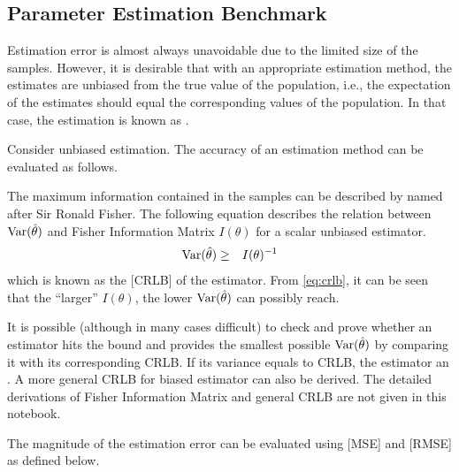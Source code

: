 \subsection{Parameter Estimation Benchmark}

Estimation error is almost always unavoidable due to the limited size of the samples. However, it is desirable that with an appropriate estimation method, the estimates are unbiased from the true value of the population, i.e., the expectation of the estimates should equal the corresponding values of the population. In that case, the estimation is known as . 

Consider unbiased estimation. The accuracy of an estimation method can be evaluated as follows.

The maximum information contained in the samples can be described by  named after Sir Ronald Fisher. The following equation describes the relation between $\textup{Var}(\hat{\theta})$ and Fisher Information Matrix $I(\theta)$ for a scalar unbiased estimator.
\begin{eqnarray}
	\textup{Var}(\hat{\theta}) &\geq& I(\theta)^{-1} \label{eq:crlb}
\end{eqnarray}
which is known as the [CRLB] of the estimator. From \eqref{eq:crlb}, it can be seen that the ``larger'' $I(\theta)$, the lower $\textup{Var}(\hat{\theta})$  can possibly reach.

It is possible (although in many cases difficult) to check and prove whether an estimator hits the bound and provides the smallest possible $\textup{Var}(\hat{\theta})$ by comparing it with its corresponding CRLB. If its variance equals to CRLB, the estimator an . A more general CRLB for biased estimator can also be derived. The detailed derivations of Fisher Information Matrix and general CRLB are not given in this notebook.

The magnitude of the estimation error can be evaluated using [MSE] and [RMSE] as defined below. 

